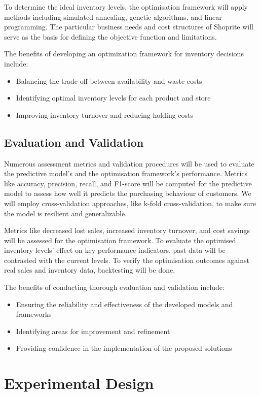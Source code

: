 \documentclass{article}
\begin{document}
To determine the ideal inventory levels, the optimisation framework will apply methods including simulated annealing, genetic algorithms, and linear programming. The particular business needs and cost structures of Shoprite will serve as the basis for defining the objective function and limitations.

The benefits of developing an optimization framework for inventory decisions include:
\begin{itemize}
  \item Balancing the trade-off between availability and waste costs
  \item Identifying optimal inventory levels for each product and store
  \item Improving inventory turnover and reducing holding costs
\end{itemize}

\subsection{Evaluation and Validation}
Numerous assessment metrics and validation procedures will be used to evaluate the predictive model's and the optimisation framework's performance. Metrics like accuracy, precision, recall, and F1-score will be computed for the predictive model to assess how well it predicts the purchasing behaviour of customers. We will employ cross-validation approaches, like k-fold cross-validation, to make sure the model is resilient and generalizable.

Metrics like decreased lost sales, increased inventory turnover, and cost savings will be assessed for the optimisation framework. To evaluate the optimised inventory levels' effect on key performance indicators, past data will be contrasted with the current levels. To verify the optimisation outcomes against real sales and inventory data, backtesting will be done.

The benefits of conducting thorough evaluation and validation include:
\begin{itemize}
  \item Ensuring the reliability and effectiveness of the developed models and frameworks
  \item Identifying areas for improvement and refinement
  \item Providing confidence in the implementation of the proposed solutions
\end{itemize}

\section{Experimental Design}
\end{document}
